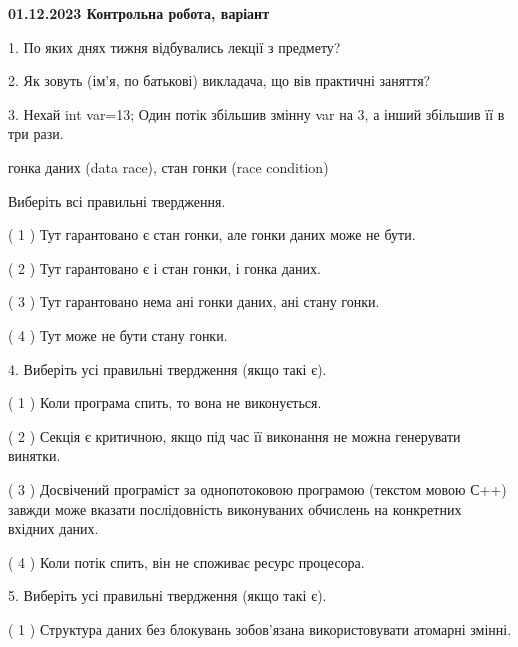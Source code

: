 \documentclass[12pt, ukrainian]{article}
\begin{document}
\vspace{4mm}
\newpage
\begin {large}

\textbf{01.12.2023 Контрольна робота, варіант  }\par


{
1. По яких днях тижня відбувались лекції з предмету?



\vspace{5mm}
2. Як зовуть (ім'я, по батькові) викладача, що вів практичні заняття?



\vspace{5mm}
3. Нехай int var=13; Один потік збільшив змінну var на 3, а інший збільшив її в три рази.

гонка даних (data race), стан гонки (race condition)

Виберіть всі правильні твердження.\par
\vspace{2mm}
( 1 ) Тут гарантовано є стан гонки, але гонки даних може не бути.%

( 2 ) Тут гарантовано є і стан гонки, і гонка даних.%

( 3 ) Тут гарантовано нема ані гонки даних, ані стану гонки.%

( 4 ) Тут може не бути стану гонки.%


\vspace{5mm}
4. Виберіть усі правильні твердження (якщо такі є).\par
\vspace{2mm}

( 1 ) Коли програма спить, то вона не виконується.%

( 2 ) Секція є критичною, якщо під час її виконання не можна генерувати винятки.%

( 3 ) Досвічений програміст за однопотоковою програмою (текстом мовою С++) завжди може вказати послідовність виконуваних обчислень на конкретних вхідних даних.%

( 4 ) Коли потік спить, він не споживає ресурс процесора.%


\vspace{5mm}
5. Виберіть усі правильні твердження (якщо такі є).\par
\vspace{2mm}

( 1 ) Структура даних без блокувань зобов’язана використовувати атомарні змінні.%

}
\end{large}
\end{document}
